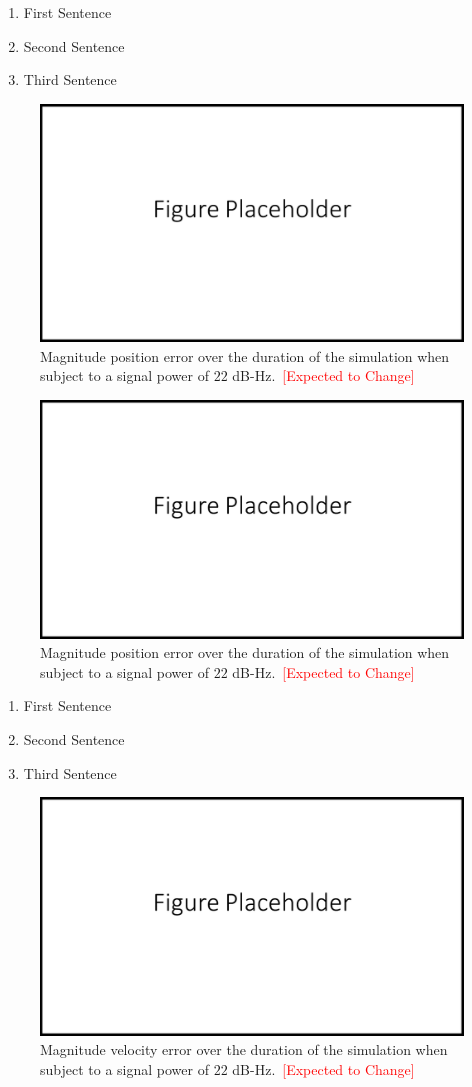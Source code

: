 \begin{enumerate}
    \item First Sentence
    \item Second Sentence
    \item Third Sentence
\end{enumerate}

\begin{figure}[!ht]
    \centering
    \includegraphics[width=0.5\linewidth]{Figures/FigurePlaceholder.png}
    \caption{Magnitude position error over the duration of the simulation when subject to a signal power of \(22\) dB-Hz.~\textcolor{red}{[Expected to Change]}}\label{fig:positionerror452}
\end{figure}

\begin{figure}[!ht]
    \centering
    \includegraphics[width=0.5\linewidth]{Figures/FigurePlaceholder.png}
    \caption{Magnitude position error over the duration of the simulation when subject to a signal power of \(22\) dB-Hz.~\textcolor{red}{[Expected to Change]}}\label{fig:positionerror222}
\end{figure}

\begin{enumerate}
    \item First Sentence
    \item Second Sentence
    \item Third Sentence
\end{enumerate}

\begin{figure}[!ht]
    \centering
    \includegraphics[width=0.5\linewidth]{Figures/FigurePlaceholder.png}
    \caption{Magnitude velocity error over the duration of the simulation when subject to a signal power of \(22\) dB-Hz.~\textcolor{red}{[Expected to Change]}}\label{fig:velocityerror222}
\end{figure}

